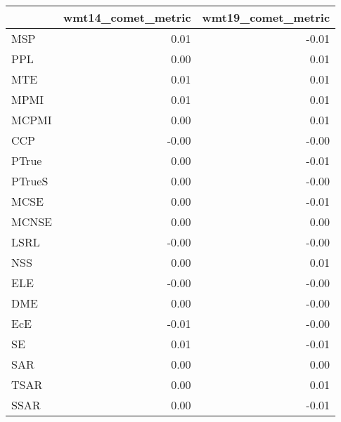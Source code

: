 \begin{tabular}{lrr}
\toprule
 & wmt14\_comet\_metric & wmt19\_comet\_metric \\
\midrule
MSP & 0.01 & -0.01 \\
PPL & 0.00 & 0.01 \\
MTE & 0.01 & 0.01 \\
MPMI & 0.01 & 0.01 \\
MCPMI & 0.00 & 0.01 \\
CCP & -0.00 & -0.00 \\
PTrue & 0.00 & -0.01 \\
PTrueS & 0.00 & -0.00 \\
MCSE & 0.00 & -0.01 \\
MCNSE & 0.00 & 0.00 \\
LSRL & -0.00 & -0.00 \\
NSS & 0.00 & 0.01 \\
ELE & -0.00 & -0.00 \\
DME & 0.00 & -0.00 \\
EcE & -0.01 & -0.00 \\
SE & 0.01 & -0.01 \\
SAR & 0.00 & 0.00 \\
TSAR & 0.00 & 0.01 \\
SSAR & 0.00 & -0.01 \\
\bottomrule
\end{tabular}
